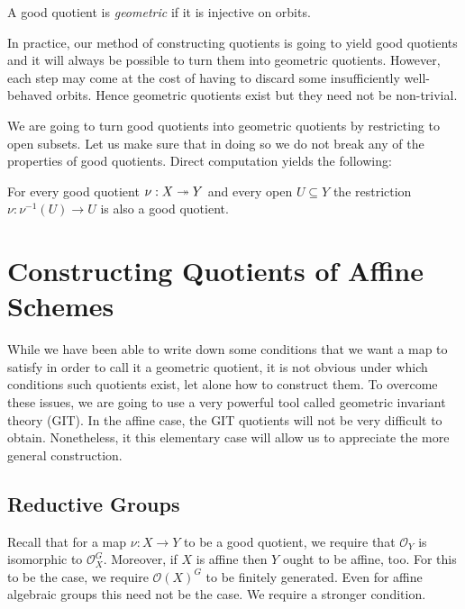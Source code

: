 \documentclass[12pt]{ociamthesis}  %
\begin{document}
\begin{definition}\label{def:geometric_quotient}
  A good quotient is \emph{geometric} if it is injective on orbits.
\end{definition}

In practice, our method of constructing quotients is going to yield
good quotients and it will always be possible to turn them into geometric
quotients. However, each step may come at the cost of having to
discard some insufficiently well-behaved orbits. Hence geometric quotients
exist but they need not be non-trivial.

We are going to turn good quotients into geometric quotients by
restricting to open subsets. Let us make sure that in doing so we
do not break any of the properties of good quotients. Direct computation
yields the following:

\begin{lemma}\label{lem:restrictions_of_good_quotients}
  For every good quotient $\nu:X\twoheadrightarrow Y$ and every open $U\subseteq Y$
  the restriction $\nu : \nu^{-1}(U)\to U$ is
  also a good quotient.
\end{lemma}

\section{Constructing Quotients of Affine Schemes}

While we have been able to write down some conditions that we want
a map to satisfy in order to call it a geometric quotient, it is not
obvious under which conditions such quotients exist, let alone how to
construct them. To overcome these issues, we are going to
use a very powerful tool called geometric invariant theory (GIT).
In the affine case, the GIT quotients will not be very difficult
to obtain. Nonetheless, it this elementary case will
allow us to appreciate the more general construction.

\subsection{Reductive Groups}

Recall that for a map $\nu : X\to Y$ to be a good quotient, we
require that $\mathscr O_Y$ is isomorphic to $\mathscr O_X^G$.
Moreover, if $X$ is affine then $Y$ ought to be affine, too. For
this to be the case, we require $\mathscr O(X)^G$ to be
finitely generated. Even for affine algebraic groups this
need not be the case. We require a stronger condition.
\end{document}
